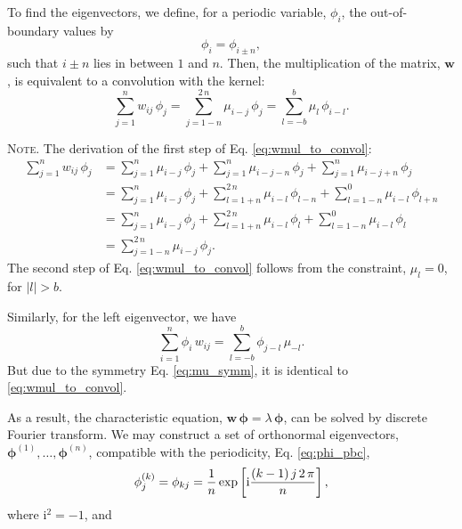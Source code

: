 \documentclass[reprint, superscriptaddress, floatfix]{revtex4-1}
\newcommand{\note}[1]{{\color{DarkGreen}\footnotesize \textsc{Note.} #1}}
\newcommand{\ii}{\mathrm{i}}
\begin{document}
To find the eigenvectors,
we define, for a periodic variable, $\phi_i$,
the out-of-boundary values by
%
\begin{equation}
  \phi_i = \phi_{i \pm n},
\label{eq:phi_pbc}
\end{equation}
%
such that $i \pm n$ lies in between $1$ and $n$.
%
Then, the multiplication of the matrix, $\mathbf w$,
is equivalent to a convolution with the kernel:
%
\begin{equation}
  \sum_{ j = 1 }^n
    w_{ij} \, \phi_j
  =
  \sum_{ j = 1 - n }^{ 2 \, n }
    \mu_{i - j} \, \phi_j
  =
  \sum_{ l = -b }^{ b }
    \mu_l \, \phi_{ i - l}
  .
\label{eq:wmul_to_convol}
\end{equation}
%
\note{The derivation of the first step of
  Eq. \eqref{eq:wmul_to_convol}:
$$
\begin{aligned}
  \sum_{j = 1}^n
    w_{ij} \, \phi_j
  &=
  \sum_{j = 1}^n
    \mu_{i - j} \, \phi_j
  +
  \sum_{j = 1}^n
    \mu_{i - j - n} \, \phi_j
  +
  \sum_{j = 1}^n
    \mu_{i - j + n} \, \phi_j
  \\
  &=
  \sum_{j = 1}^n
    \mu_{i - j} \, \phi_j
  +
  \sum_{l = 1+n}^{2 \, n}
    \mu_{i - l} \, \phi_{l - n}
  +
  \sum_{l = 1-n}^0
    \mu_{i - l} \, \phi_{l + n}
  \\
  &=
  \sum_{j = 1}^n
    \mu_{i - j} \, \phi_j
  +
  \sum_{l = 1+n}^{2 \, n}
    \mu_{i - l} \, \phi_{l}
  +
  \sum_{l = 1-n}^0
    \mu_{i - l} \, \phi_{l}
  \\
  &=
  \sum_{j = 1-n}^{2 \, n}
    \mu_{i - j} \, \phi_j
  .
\end{aligned}
$$
The second step of Eq. \eqref{eq:wmul_to_convol}
follows from the constraint, $\mu_l = 0$, for $|l| > b$.

Similarly,
for the left eigenvector, we have
$$
  \sum_{ i = 1 }^n
    \phi_i \, w_{ij}
  =
  \sum_{ l = -b }^b
    \phi_{j - l} \, \mu_{-l}
  .
$$
But due to the symmetry Eq. \eqref{eq:mu_symm},
it is identical to \eqref{eq:wmul_to_convol}.
}
%
As a result, the characteristic equation,
$\mathbf w \, \pmb\phi = \lambda \, \pmb\phi$,
can be solved by discrete Fourier transform.
%
We may construct a set of orthonormal eigenvectors,
$\pmb\phi^{(1)}, \dots, \pmb\phi^{(n)}$,
compatible with the periodicity, Eq. \eqref{eq:phi_pbc},
%
\begin{equation}
  \phi^{(k)}_j
  =
  \phi_{kj}
  =
  \frac 1 n
  \exp
  \left[
    \ii
    \frac{ (k - 1) \, j \, 2 \, \pi }
         {            n             }
  \right]
  ,
  \notag
\end{equation}
%
where $\ii^2 = -1$, and
\end{document}
